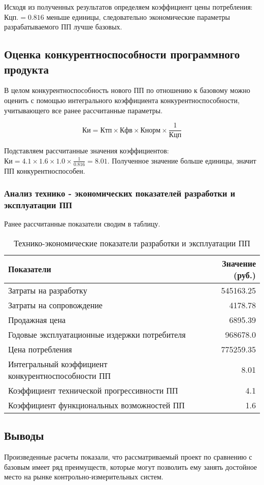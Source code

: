 Исходя из полученных результатов определяем коэффициент цены потребления: $Кцп.=0.816$ меньше единицы,
следовательно экономические параметры разрабатываемого ПП лучше базовых.

\subsection{Оценка конкурентноспособности программного продукта}
В целом конкурентноспособность нового ПП по отношению к базовому можно оценить с помощью интегрального
коэффициента конкурентноспособности, учитывающего все ранее рассчитанные параметры.

\begin{equation}
Ки = Ктп \times{} Кфв \times{} Кнорм \times{} \frac{1}{Кцп}
\end{equation}

Подставляем рассчитанные значения коэффициентов: $Ки = 4.1 \times{} 1.6 \times{} 1.0 \times{} \frac{1}{0.816} = 8.01$.
Полученное значение больше единицы, значит ПП конкурентноспособен.

\subsubsection{Анализ технико - экономических показателей разработки и эксплуатации ПП}
\begin{par}
Ранее рассчитанные показатели сводим в таблицу.
\begin{table}
\caption{Технико-экономические показатели разработки и эксплуатации  ПП}
\begin{tabular}{|l|r|}
\hline{}
Показатели & Значение (руб.) \\
\hline{}
Затраты на разработку & 545163.25 \\
\hline{}
Затраты на сопровождение & 4178.78 \\
\hline{}
Продажная цена & 6895.39 \\
\hline{}
Годовые эксплуатационные издержки потребителя & 968678.0 \\
\hline{}
Цена потребления & 775259.35 \\
\hline{}
Интегральный коэффициент   конкурентноспособности ПП & 8.01 \\
\hline{}
Коэффициент технической прогрессивности ПП & 4.1 \\
\hline{}
Коэффициент функциональных возможностей ПП & 1.6 \\
\hline
\end{tabular}
\label{table:econSostavIspol}
\end{table}
\end{par}

\subsection{Выводы}
Произведенные расчеты показали, что рассматриваемый проект по сравнению с базовым имеет ряд преимуществ,
которые могут позволить ему занять достойное место на рынке контрольно-измерительных систем.
\newpage{}
